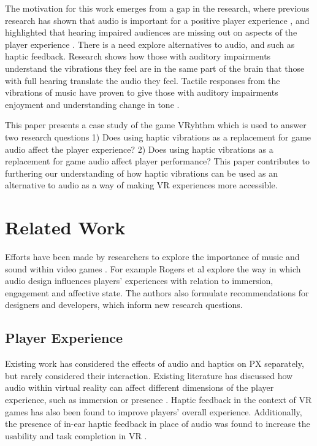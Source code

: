 \documentclass[manuscript,screen]{acmart}
\begin{document}
The motivation for this work emerges from a gap in the research, where previous research has shown that audio is important for a positive player experience \cite{rogers2017exploring}, and highlighted that hearing impaired audiences are missing out on aspects of the player experience \cite{yuan2011game}. There is a need explore alternatives to audio, and such as haptic feedback. Research shows how those with auditory impairments understand the vibrations they feel are in the same part of the brain that those with full hearing translate the audio they feel\cite{elaine2017}. Tactile responses from the vibrations of music have proven to give those with auditory impairments enjoyment and understanding change in tone \cite{elaine2017}.

This paper presents a case study of the game VRyhthm which is used to answer two research questions 1) Does using haptic vibrations as a replacement for game audio affect the player experience? 2) Does using haptic vibrations as a replacement for game audio affect player performance? This paper contributes to furthering our understanding of how haptic vibrations can be used as an alternative to audio as a way of making VR experiences more accessible. 

\section{Related Work}

Efforts have been made by researchers to explore the importance of music and sound within video games \cite{peerdeman2010sound}
. For example Rogers et al \cite{rogers2018vanishing} explore the way in which audio design influences players' experiences with relation to immersion, engagement and affective state. The authors also formulate recommendations for designers and developers, which inform new research questions.

\subsection{Player Experience}
Existing work has considered the effects of audio and haptics on PX separately, but rarely considered their interaction. Existing literature has discussed how audio within virtual reality can affect different dimensions of the  player experience, such as immersion or presence \cite{rogers2017exploring, rogers2018vanishing}. Haptic feedback in the context of VR games has also been found to improve players' overall experience\cite{8446619}. Additionally, the presence of in-ear haptic feedback in place of audio was found to increase the usability and task completion in VR \cite{mirzaei2020earvr}.
\end{document}
